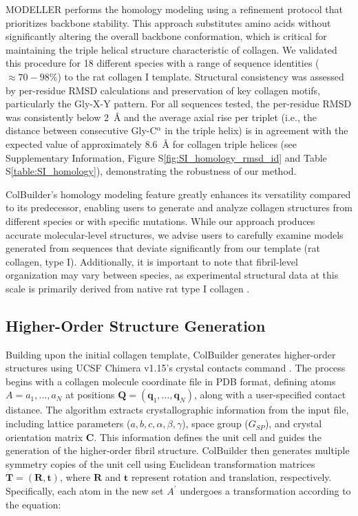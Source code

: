 \documentclass[10pt,letterpaper]{article}
\begin{document}
MODELLER performs the homology modeling using a refinement protocol that prioritizes backbone stability. This approach substitutes amino acids without significantly altering the overall backbone conformation, which is critical for maintaining the triple helical structure characteristic of collagen. We validated this procedure for 18 different species with a range of sequence identities (\(\approx 70-98\%\)) to the rat collagen I template. Structural consistency was assessed by per-residue RMSD calculations and preservation of key collagen motifs, particularly the Gly-X-Y pattern. For all sequences tested, the per-residue RMSD was consistently below \SI{2}{\angstrom} and the average axial rise per triplet (i.e., the distance between consecutive Gly-C\(^\alpha\) in the triple helix) is in agreement with the expected value of approximately \SI{8.6}{\angstrom} for collagen triple helices \cite{bella1994crystal} (see Supplementary Information, Figure S\ref{fig:SI_homology_rmsd_id} and Table S\ref{table:SI_homology}), demonstrating the robustness of our method.

ColBuilder's homology modeling feature greatly enhances its versatility compared to its predecessor, enabling users to generate and analyze collagen structures from different species or with specific mutations. While our approach produces accurate molecular-level structures, we advise users to carefully examine models generated from sequences that deviate significantly from our template (rat collagen, type I). Additionally, it is important to note that fibril-level organization may vary between species, as experimental structural data at this scale is primarily derived from native rat type I collagen \cite{orgel2006microfibrillar}.

\subsection*{Higher-Order Structure Generation}\label{subsec2}

Building upon the initial collagen template, ColBuilder generates higher-order structures using UCSF Chimera v1.15's crystal contacts command \cite{pettersen2004chimera}. The process begins with a collagen molecule coordinate file in PDB format, defining atoms \(A={a_1,...,a_N}\) at positions \(\bm{Q}=\left(\bm{q}_1,...,\bm{q}_N\right)\), along with a user-specified contact distance. The algorithm extracts crystallographic information from the input file, including lattice parameters (\(a, b, c, \alpha, \beta, \gamma\)), space group (\(G_{SP}\)), and crystal orientation matrix \(\bm{C}\). This information defines the unit cell and guides the generation of the higher-order fibril structure. ColBuilder then generates multiple symmetry copies of the unit cell using Euclidean transformation matrices \(\bm{T}=(\bm{R},\bm{t})\), where \(\bm{R}\) and \(\bm{t}\) represent rotation and translation, respectively. Specifically, each atom in the new set \(A^\prime\) undergoes a transformation according to the equation:
\end{document}
